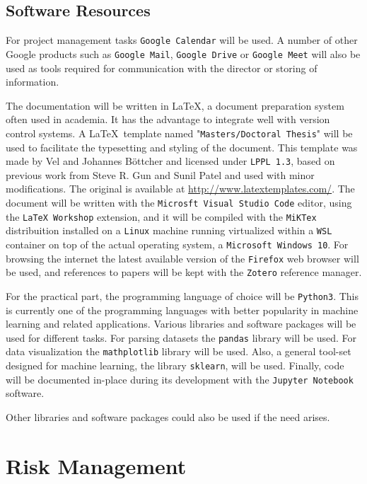 \subsection{Software Resources}

For project management tasks \texttt{Google Calendar} will be used. A number of other Google products such as \texttt{Google Mail}, \texttt{Google Drive} or \texttt{Google Meet} will also be used as tools required for communication with the director or storing of information.

The documentation will be written in \LaTeX, a document preparation system often used in academia. It has the advantage to integrate well with version control systems. A \LaTeX \ template named "\texttt{Masters/Doctoral Thesis}" will be used to facil\-itate the type\-setting and styling of the document. This template was made by Vel and Johannes Böttcher and licensed under \texttt{LPPL 1.3}, based on previous work from Steve R. Gun and Sunil Patel and used with minor modifications. The original is available at \url{http://www.latextemplates.com/}. The document will be written with the \texttt{Microsft Visual Studio Code} editor, using the \texttt{LaTeX Workshop} extension, and it will be compiled with the \texttt{MiKTex} distribuition installed on a \texttt{Linux} machine run\-ning virtualized within a \texttt{WSL} container on top of the actual operating system, a \texttt{Microsoft Windows 10}. For browsing the internet the latest available version of the \texttt{Firefox} web browser will be used, and references to papers will be kept with the \texttt{Zotero} reference manager.

For the practical part, the programming language of choice will be \texttt{Python3}. This is currently one of the programming languages with better popularity in machine learning and related applications. Various libraries and software packages will be used for different tasks. For parsing datasets the \texttt{pandas} library will be used. For data visualization the \texttt{mathplotlib} library will be used. Also, a general tool-set designed for machine learning, the library \texttt{sklearn}, will be used. Finally, code will be documented in-place during its development with the \texttt{Jupyter Notebook} software.

Other libraries and software packages could also be used if the need arises. 

\section{Risk Management}

